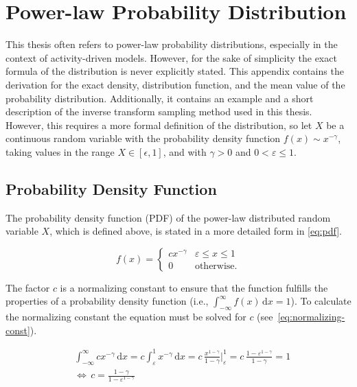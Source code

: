\chapter{Power-law Probability Distribution}


This thesis often refers to power-law probability distributions, especially in the context of activity-driven models.
However, for the sake of simplicity the exact formula of the distribution is never explicitly stated.
This appendix contains the derivation for the exact density, distribution function, and the mean value of the probability distribution.
Additionally, it contains an example and a short description of the inverse transform sampling method used in this thesis.
However, this requires a more formal definition of the distribution, so let \(X\) be a continuous random variable with the probability density function \(f(x) \sim x^{-\gamma}\), taking values in the range \(X \in [\epsilon, 1]\), and with \(\gamma > 0\) and \(0 < \varepsilon \leq 1\).




\section{Probability Density Function}
\label{sec:pdf}

The probability density function (PDF) of the power-law distributed random variable \(X\), which is defined above, is stated in a more detailed form in \cref{eq:pdf}.

\begin{equation}
	f(x) =
	\begin{cases}
		c x^{-\gamma} & \varepsilon \leq x \leq 1 \\
		0             & \text{otherwise.}
	\end{cases}
	\label{eq:pdf}
\end{equation}

The factor \(c\) is a normalizing constant to ensure that the function fulfills the properties of a probability density function (i.e., \(\int_{-\infty}^{\infty} f(x) \, \mathrm{d}x = 1\)).
To calculate the normalizing constant the equation must be solved for \(c\) (see~\cref{eq:normalizing-const}).

\begin{align}
	& \int_{-\infty}^{\infty} cx^{-\gamma} \, \mathrm{d}x = c \int_{\varepsilon}^{1} x^{-\gamma} \, \mathrm{d}x = c \, \frac{x^{1-\gamma}}{1-\gamma}  \bigg |_{\varepsilon}^{1} = c \, \frac{1 - \varepsilon^{1-\gamma}}{1-\gamma} = 1 \\
	& \Leftrightarrow \, c = \frac{1-\gamma}{1 - \varepsilon^{1-\gamma}}
	\label{eq:normalizing-const}
\end{align}


